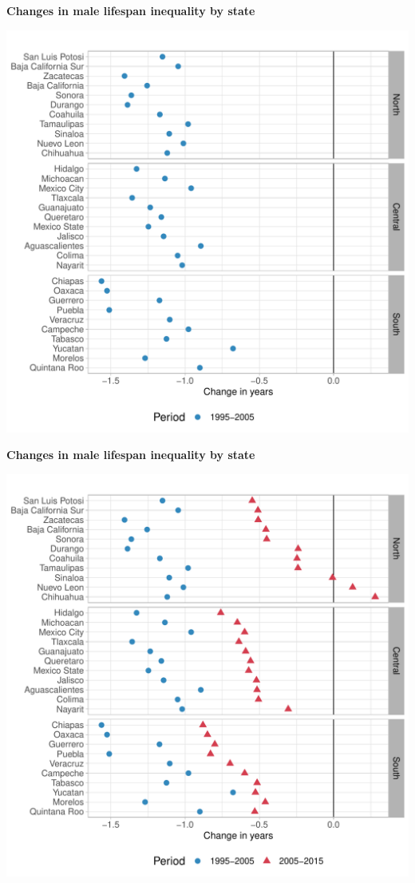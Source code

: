 \documentclass[xcolor={dvipsnames}]{beamer}
\begin{document}
\begin{frame}
	\begin{center}
		\Large{\textbf{Changes in male lifespan inequality by state}}

		\includegraphics[scale=.47]{Figures/Figure_3_1}
		\end{center}

\end{frame}

\begin{frame}
	\begin{center}
		\Large{\textbf{Changes in male lifespan inequality by state}}

		\includegraphics[scale=.47]{Figures/Figure_3}
		\end{center}

\end{frame}
\end{document}
